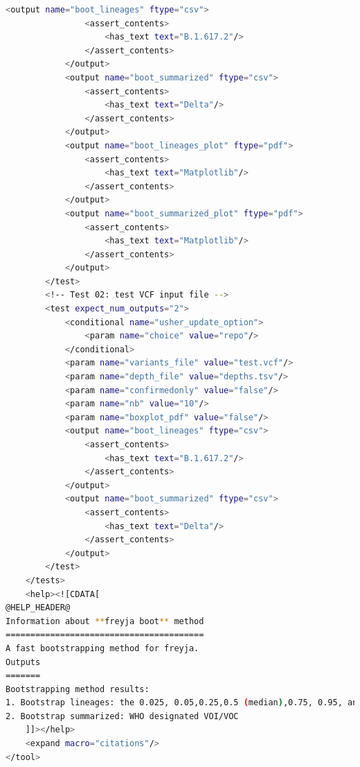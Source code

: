 \begin{lstlisting}[language=bash, caption=tool wrapper for Freyja: Bootstrapping method, label=list:methods:wrapper-freyja-boot]
            <output name="boot_lineages" ftype="csv">
                <assert_contents>
                    <has_text text="B.1.617.2"/>
                </assert_contents>
            </output>
            <output name="boot_summarized" ftype="csv">
                <assert_contents>
                    <has_text text="Delta"/>
                </assert_contents>
            </output>
            <output name="boot_lineages_plot" ftype="pdf">
                <assert_contents>
                    <has_text text="Matplotlib"/>
                </assert_contents>
            </output>
            <output name="boot_summarized_plot" ftype="pdf">
                <assert_contents>
                    <has_text text="Matplotlib"/>
                </assert_contents>
            </output>
        </test>
        <!-- Test 02: test VCF input file -->
        <test expect_num_outputs="2">
            <conditional name="usher_update_option">
                <param name="choice" value="repo"/>
            </conditional>
            <param name="variants_file" value="test.vcf"/>
            <param name="depth_file" value="depths.tsv"/>
            <param name="confirmedonly" value="false"/>
            <param name="nb" value="10"/>
            <param name="boxplot_pdf" value="false"/>
            <output name="boot_lineages" ftype="csv">
                <assert_contents>
                    <has_text text="B.1.617.2"/>
                </assert_contents>
            </output>
            <output name="boot_summarized" ftype="csv">
                <assert_contents>
                    <has_text text="Delta"/>
                </assert_contents>
            </output>
        </test>
    </tests>
    <help><![CDATA[
@HELP_HEADER@
Information about **freyja boot** method
========================================
A fast bootstrapping method for freyja.
Outputs
=======
Bootstrapping method results:
1. Bootstrap lineages: the 0.025, 0.05,0.25,0.5 (median),0.75, 0.95, and 0.975 percentiles for each lineage;
2. Bootstrap summarized: WHO designated VOI/VOC
    ]]></help>
    <expand macro="citations"/>
</tool>
\end{lstlisting}
